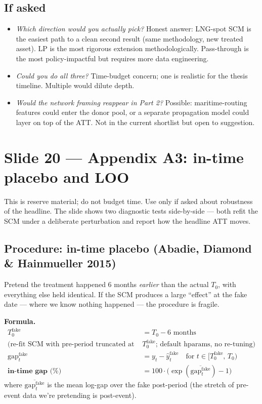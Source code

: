 \documentclass[11pt,a4paper]{article}
\begin{document}
\subsection{If asked}
\begin{itemize}
  \item \textit{Which direction would you actually pick?} Honest answer: LNG-spot SCM is the easiest path to a clean second result (same methodology, new treated asset). LP is the most rigorous extension methodologically. Pass-through is the most policy-impactful but requires more data engineering.
  \item \textit{Could you do all three?} Time-budget concern; one is realistic for the thesis timeline. Multiple would dilute depth.
  \item \textit{Would the network framing reappear in Part 2?} Possible: maritime-routing features could enter the donor pool, or a separate propagation model could layer on top of the ATT. Not in the current shortlist but open to suggestion.
\end{itemize}

\section{Slide 20 --- Appendix A3: in-time placebo and LOO}

This is reserve material; do not budget time. Use only if asked about robustness of the headline. The slide shows two diagnostic tests side-by-side --- both refit the SCM under a deliberate perturbation and report how the headline ATT moves.

\subsection{Procedure: in-time placebo (Abadie, Diamond \& Hainmueller 2015)}

Pretend the treatment happened 6 months \emph{earlier} than the actual $T_0$, with everything else held identical. If the SCM produces a large ``effect'' at the fake date --- where we know nothing happened --- the procedure is fragile.

\textbf{Formula.}
\begin{align*}
T_0^{\text{fake}} &= T_0 - 6\text{ months} \\
\text{(re-fit SCM with pre-period truncated at } & T_0^{\text{fake}} \text{; default hparams, no re-tuning)}\\
\text{gap}^{\text{fake}}_t &= y_t - \hat{y}^{\text{fake}}_t \quad \text{for } t \in [T_0^{\text{fake}},\, T_0) \\
\textbf{in-time gap (\%)} &= 100 \cdot \big(\exp(\overline{\text{gap}^{\text{fake}}_t}) - 1\big)
\end{align*}
where $\overline{\text{gap}^{\text{fake}}_t}$ is the mean log-gap over the fake post-period (the stretch of pre-event data we're pretending is post-event).
\end{document}
